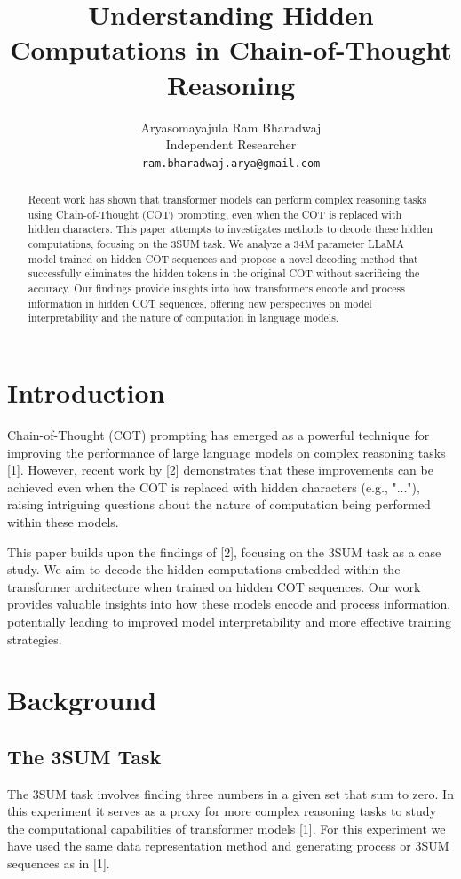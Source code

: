 \documentclass[10pt,a4paper]{article}
\title{Understanding Hidden Computations in Chain-of-Thought Reasoning}
\author{Aryasomayajula Ram Bharadwaj\\
Independent Researcher\\
\texttt{ram.bharadwaj.arya@gmail.com}}
\begin{document}
\maketitle

\begin{abstract}
Recent work has shown that transformer models can perform complex reasoning tasks using Chain-of-Thought (COT) prompting, even when the COT is replaced with hidden characters. This paper attempts to investigates methods to decode these hidden computations, focusing on the 3SUM task. We analyze a 34M parameter LLaMA model trained on hidden COT sequences and propose a novel decoding method that successfully eliminates the hidden tokens in the original COT without sacrificing the accuracy. Our findings provide insights into how transformers encode and process information in hidden COT sequences, offering new perspectives on model interpretability and the nature of computation in language models.

\end{abstract}

\section{Introduction}
Chain-of-Thought (COT) prompting has emerged as a powerful technique for improving the performance of large language models on complex reasoning tasks [1]. However, recent work by [2] demonstrates that these improvements can be achieved even when the COT is replaced with hidden characters (e.g., "..."), raising intriguing questions about the nature of computation being performed within these models.

This paper builds upon the findings of [2], focusing on the 3SUM task as a case study. We aim to decode the hidden computations embedded within the transformer architecture when trained on hidden COT sequences. Our work provides valuable insights into how these models encode and process information, potentially leading to improved model interpretability and more effective training strategies.

\section{Background}

\subsection{The 3SUM Task}
The 3SUM task involves finding three numbers in a given set that sum to zero. In this experiment it serves as a proxy for more complex reasoning tasks to study the computational capabilities of transformer models [1]. For this experiment we have used the same data representation method and generating process or 3SUM sequences as in [1].
\end{document}
